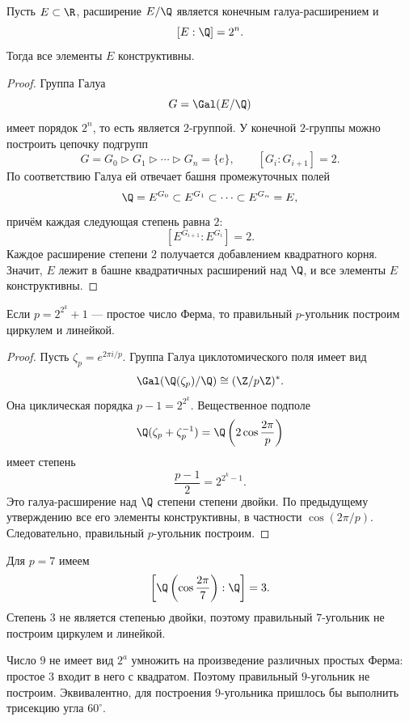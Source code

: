 \begin{stmt}
    Пусть $E\subset\R$, расширение $E/\Q$ является конечным галуа-расширением и
    \[
        [E:\Q]=2^n.
    \]
    Тогда все элементы $E$ конструктивны.

    \begin{proof}
        Группа Галуа
        \[
            G=\Gal(E/\Q)
        \]
        имеет порядок $2^n$, то есть является $2$-группой. У конечной $2$-группы можно построить цепочку подгрупп
        \[
            G=G_0 \triangleright G_1 \triangleright \cdots \triangleright G_n=\{e\},
            \qquad [G_i:G_{i+1}]=2.
        \]
        По соответствию Галуа ей отвечает башня промежуточных полей
        \[
            \Q = E^{G_0} \subset E^{G_1} \subset \cdots \subset E^{G_n}=E,
        \]
        причём каждая следующая степень равна $2$:
        \[
            [E^{G_{i+1}}:E^{G_i}]=2.
        \]
        Каждое расширение степени $2$ получается добавлением квадратного корня. Значит, $E$ лежит в башне квадратичных расширений над
        $\Q$, и все элементы $E$ конструктивны.
    \end{proof}
\end{stmt}

\begin{stmt}
    Если $p=2^{2^k}+1$ --- простое число Ферма, то правильный $p$-угольник построим циркулем и линейкой.

    \begin{proof}
        Пусть $\zeta_p=e^{2\pi i/p}$. Группа Галуа циклотомического поля имеет вид
        \[
            \Gal(\Q(\zeta_p)/\Q)\cong(\Z/p\Z)^*.
        \]
        Она циклическая порядка $p-1=2^{2^k}$. Вещественное подполе
        \[
            \Q(\zeta_p+\zeta_p^{-1})=\Q\left(2\cos\frac{2\pi}{p}\right)
        \]
        имеет степень
        \[
            \frac{p-1}{2}=2^{2^k-1}.
        \]
        Это галуа-расширение над $\Q$ степени степени двойки. По предыдущему утверждению все его элементы конструктивны,
        в частности $\cos(2\pi/p)$. Следовательно, правильный $p$-угольник построим.
    \end{proof}
\end{stmt}

\begin{example}
    Для $p=7$ имеем
    \[
        \left[\Q\left(\cos\frac{2\pi}{7}\right):\Q\right]=3.
    \]
    Степень $3$ не является степенью двойки, поэтому правильный $7$-угольник не построим циркулем и линейкой.
\end{example}

\begin{example}
    Число $9$ не имеет вид $2^a$ умножить на произведение различных простых Ферма: простое $3$ входит в него с квадратом.
    Поэтому правильный $9$-угольник не построим. Эквивалентно, для построения $9$-угольника пришлось бы выполнить трисекцию угла
    $60^\circ$.
\end{example}
